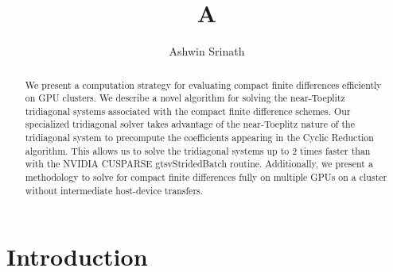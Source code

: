\documentclass{elsarticle}
\begin{document}
\begin{frontmatter}
\author{Ashwin Srinath}
\title{A}
\maketitle

\begin{abstract}
We present a computation strategy for evaluating
compact finite differences efficiently on GPU clusters.
We describe a novel algorithm for solving the
near-Toeplitz tridiagonal systems associated with
the compact finite difference schemes.
Our specialized tridiagonal solver
takes advantage of the near-Toeplitz nature of the
tridiagonal system to precompute the coefficients
appearing in the Cyclic Reduction algorithm.
This allows us to solve the tridiagonal systems
up to 2 times faster than with the NVIDIA CUSPARSE
gtsvStridedBatch routine.
Additionally, we present a methodology to solve for
compact finite differences fully on multiple GPUs on a cluster
without intermediate host-device transfers.
\end{abstract}

\end{frontmatter}

    
\section{Introduction}
\end{document}

